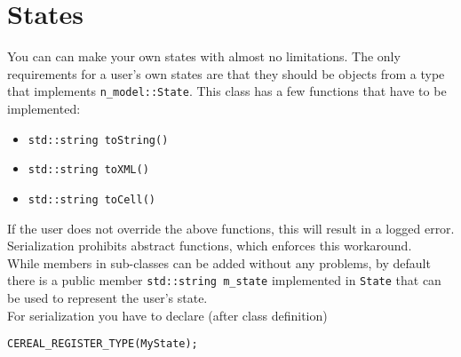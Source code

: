 \section{States}
You can can make your own states with almost no limitations. The only requirements for a user's own states are that they should be objects from a type that implements \texttt{n\_model::State}. This class has a few functions that have to be implemented:
\begin{itemize}
	\item \texttt{std::string toString()}
	\item \texttt{std::string toXML()}
	\item \texttt{std::string toCell()}
\end{itemize}
If the user does not override the above functions, this will result in a logged error. Serialization prohibits abstract functions, which enforces this workaround.\\
While members in sub-classes can be added without any problems, by default there is a public member \texttt{std::string m\_state} implemented in \texttt{State} that can be used to represent the user's state.
\\ For serialization you have to declare (after class definition) 
\begin{verbatim}
CEREAL_REGISTER_TYPE(MyState);
\end{verbatim}

